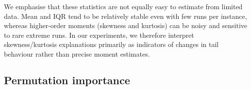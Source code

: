 We emphasise that these statistics are not equally easy to estimate from limited data. Mean and IQR tend to be relatively stable even with few runs per instance, whereas higher-order moments (skewness and kurtosis) can be noisy and sensitive to rare extreme runs. In our experiments, we therefore interpret skewness/kurtosis explanations primarily as indicators of changes in tail behaviour rather than precise moment estimates.


\subsection{Permutation importance}
\label{sec:perm_importance}



